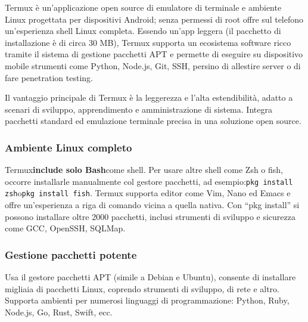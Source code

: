 


Termux è un'applicazione open source di emulatore di terminale e ambiente Linux progettata per dispositivi Android; senza permessi di root offre sul telefono un'esperienza shell Linux completa. Essendo un'app leggera (il pacchetto di installazione è di circa 30 MB), Termux supporta un ecosistema software ricco tramite il sistema di gestione pacchetti APT e permette di eseguire su dispositivo mobile strumenti come Python, Node.js, Git, SSH, persino di allestire server o di fare penetration testing.

Il vantaggio principale di Termux è la leggerezza e l'alta estendibilità, adatto a scenari di sviluppo, apprendimento e amministrazione di sistema. Integra pacchetti standard ed emulazione terminale precisa in una soluzione open source.


\subsubsection*{Ambiente Linux completo}

Termux\textbf{include solo Bash}come shell. Per usare altre shell come Zsh o fish, occorre installarle manualmente col gestore pacchetti, ad esempio:\texttt{pkg install zsh}o\texttt{pkg install fish}. Termux supporta editor come Vim, Nano ed Emacs e offre un'esperienza a riga di comando vicina a quella nativa. Con “pkg install” si possono installare oltre 2000 pacchetti, inclusi strumenti di sviluppo e sicurezza come GCC, OpenSSH, SQLMap.

\subsubsection*{Gestione pacchetti potente}

Usa il gestore pacchetti APT (simile a Debian e Ubuntu), consente di installare migliaia di pacchetti Linux, coprendo strumenti di sviluppo, di rete e altro. Supporta ambienti per numerosi linguaggi di programmazione: Python, Ruby, Node.js, Go, Rust, Swift, ecc.

